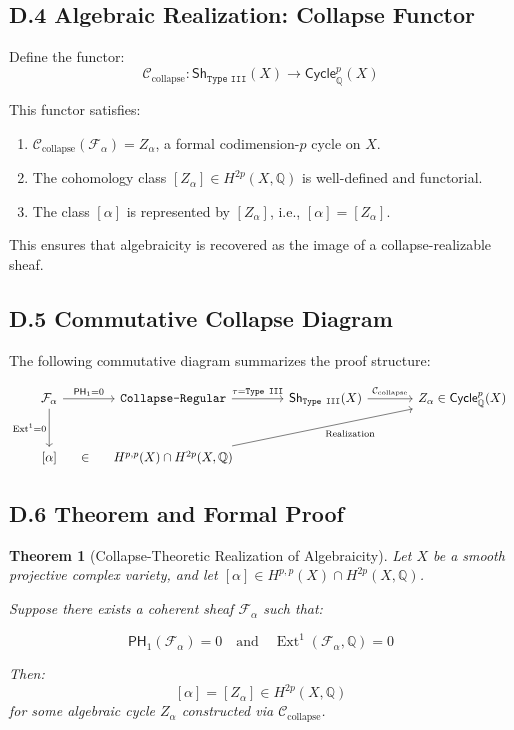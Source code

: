 \documentclass[11pt]{article}
\newtheorem{theorem}{Theorem}[section]
\DeclareMathOperator{\Ext}{Ext}
\begin{document}
\subsection*{D.4 Algebraic Realization: Collapse Functor}

Define the functor:
\[
\mathcal{C}_{\text{collapse}} : \mathsf{Sh}_{\texttt{Type III}}(X) \to \mathsf{Cycle}_\mathbb{Q}^p(X)
\]

This functor satisfies:

\begin{enumerate}
  \item $\mathcal{C}_{\text{collapse}}(\mathcal{F}_\alpha) = Z_\alpha$, a formal codimension-$p$ cycle on $X$.
  \item The cohomology class $[Z_\alpha] \in H^{2p}(X, \mathbb{Q})$ is well-defined and functorial.
  \item The class $[\alpha]$ is represented by $[Z_\alpha]$, i.e., $[\alpha] = [Z_\alpha]$.
\end{enumerate}

This ensures that algebraicity is recovered as the image of a collapse-realizable sheaf.

\subsection*{D.5 Commutative Collapse Diagram}

The following commutative diagram summarizes the proof structure:

\[
\begin{tikzcd}[row sep=large, column sep=large]
\mathcal{F}_\alpha 
  \arrow[r, "\mathsf{PH}_1 = 0"] 
  \arrow[d, swap, "\Ext^1 = 0"]
& \texttt{Collapse-Regular} 
  \arrow[r, "\tau = \texttt{Type III}"]
& \mathsf{Sh}_{\texttt{Type III}}(X) 
  \arrow[r, "\mathcal{C}_{\text{collapse}}"]
& |[alias=Z]| {Z_\alpha \in \mathsf{Cycle}_\mathbb{Q}^p(X)} \\
{[\alpha]} 
  \arrow[r, phantom, "\in"]
& H^{p,p}(X) \cap H^{2p}(X, \mathbb{Q}) 
  \arrow[to=Z, swap, "\text{Realization}"]
\end{tikzcd}
\]


\subsection*{D.6 Theorem and Formal Proof}

\begin{theorem}[Collapse-Theoretic Realization of Algebraicity]
Let $X$ be a smooth projective complex variety, and let $[\alpha] \in H^{p,p}(X) \cap H^{2p}(X, \mathbb{Q})$.

Suppose there exists a coherent sheaf $\mathcal{F}_\alpha$ such that:

\[
\mathsf{PH}_1(\mathcal{F}_\alpha) = 0 \quad \text{and} \quad \Ext^1(\mathcal{F}_\alpha, \mathbb{Q}) = 0
\]

Then:
\[
[\alpha] = [Z_\alpha] \in H^{2p}(X, \mathbb{Q})
\]
for some algebraic cycle $Z_\alpha$ constructed via $\mathcal{C}_{\text{collapse}}$.
\end{theorem}
\end{document}
